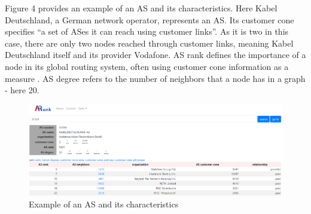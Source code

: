 \documentclass[conference, 11pt]{IEEEtran}
\begin{document}
Figure 4 provides an example of an AS and its characteristics. Here Kabel Deutschland, a German network operator, represents an AS. Its customer cone specifies  ``a set of ASes it can reach using customer links''. As it is two in this case, there are only two nodes reached through customer links, meaning Kabel Deutschland itself and its provider Vodafone\cite{Rank}.  
AS rank defines the importance of a node in its global routing system, often using customer cone information as a measure \cite{Rank}.
AS degree refers to the number of neighbors that a node has in a graph - here 20\cite{Cone}.  \\
\begin{figure}[htbp]
\centerline{\includegraphics[scale=0.21]{Graphics/asExample.PNG}}
\caption{Example of an AS and its characteristics}
\label{fig}
\end{figure}
\end{document}

